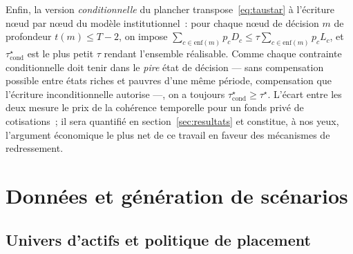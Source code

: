 \documentclass[11pt,letterpaper]{article}
\newcommand{\taustar}{\tau^{\star}}
\theoremstyle{definition}
\begin{document}
Enfin, la version \emph{conditionnelle} du plancher transpose~\eqref{eq:taustar} à
l'écriture n\oe ud par n\oe ud du modèle institutionnel~: pour chaque n\oe ud de
décision $m$ de profondeur $t(m) \le T-2$, on impose
$\sum_{c \in \mathrm{enf}(m)} p_c D_c \le \tau \sum_{c \in \mathrm{enf}(m)} p_c
L_c$, et $\taustar_{\mathrm{cond}}$ est le plus petit $\tau$ rendant l'ensemble
réalisable. Comme chaque contrainte conditionnelle doit tenir dans le \emph{pire}
état de décision --- sans compensation possible entre états riches et pauvres
d'une même période, compensation que l'écriture inconditionnelle autorise ---, on
a toujours $\taustar_{\mathrm{cond}} \ge \taustar$. L'écart entre les deux mesure
le prix de la cohérence temporelle pour un fonds privé de cotisations~; il sera
quantifié en section~\ref{sec:resultats} et constitue, à nos yeux, l'argument
économique le plus net de ce travail en faveur des mécanismes de redressement.

\section{Données et génération de scénarios}\label{sec:donnees}

\subsection{Univers d'actifs et politique de placement}\label{ssec:univers}
\end{document}
